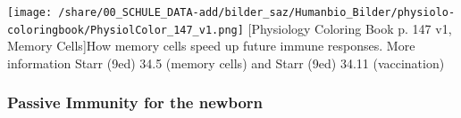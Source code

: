 		\hspace{-3cm}
		\begin{minipage}{18cm}
		  \texttt{[image: /share/00\_SCHULE\_DATA-add/bilder\_saz/Humanbio\_Bilder/physiolo-coloringbook/PhysiolColor\_147\_v1.png]}
		  [Physiology Coloring Book p. 147 v1, Memory Cells]{How memory cells speed up future immune responses. More information   Starr (9ed) 34.5 (memory cells) and   Starr (9ed) 34.11 (vaccination) }
		  \label{fig:MemoryCells}
		\end{minipage}

\vfill
\subsubsection{Passive Immunity for the newborn}

